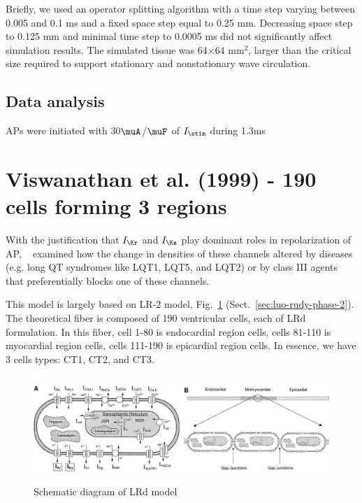 Briefly, we used an operator splitting algorithm with a time step
varying between 0.005 and 0.1 ms and a fixed space step equal to 0.25
mm. Decreasing space step to 0.125 mm and minimal time step to 0.0005
ms did not significantly affect simulation results. The simulated
tissue was 64$\times$64 mm$^2$, larger than the critical size required to
support stationary and nonstationary wave circulation.

\subsection{Data analysis}
\label{sec:data-analysis-3}

APs were initiated with 30$\muA$/$\muF$ of $I_\stim$ during 1.3ms


\section{Viswanathan et al. (1999) - 190 cells forming 3 regions}
\label{sec:viswanathan-et-al}

With the justification that $I_\Kr$ and $I_\Ks$ play dominant roles in
repolarization of AP, ~\citep{viswanathan1999} examined how the change
in densities of these channels altered by diseases (e.g. long QT
syndromes like LQT1, LQT5, and LQT2) or by class III agents that
preferentially blocks one of these channels. 

This model is largely based on LR-2 model,
Fig.~\ref{fig:Viswanathan_model} (Sect.~\ref{sec:luo-rudy-phase-2}). 
The theoretical fiber is composed of 190 ventricular cells, each of
LRd formulation. In this fiber, cell 1-80 is endocardial region cells,
cells 81-110 is myocardial region cells, cells 111-190 is epicardial
region cells. In essence, we have 3 cells types: CT1, CT2, and CT3. 

\begin{figure}[hbt]
  \centerline{\includegraphics[height=4cm,
    angle=0]{./images/Viswanathan_model.eps}}
\caption{Schematic diagram of LRd model}
\label{fig:Viswanathan_model}
\end{figure}

